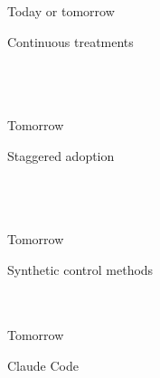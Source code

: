 \documentclass[aspectratio=169,11pt]{beamer}
\begin{document}
\begin{frame}{Today or tomorrow}
\vspace{1.4em}
\begin{center}
{\Large Continuous treatments}\\[1.8em]
{\large {}}\\[0.5em]
{\large {}}\\[0.5em]
{\large {}}\\[0.5em]
{\large {}}
\end{center}
\end{frame}

\begin{frame}{Tomorrow}
\vspace{1.4em}
\begin{center}
{\Large Staggered adoption}\\[1.8em]
{\large {}}\\[0.5em]
{\large {}}\\[0.5em]
{\large {}}\\[0.5em]
{\large {}}
\end{center}
\end{frame}

\begin{frame}{Tomorrow}
\vspace{1.4em}
\begin{center}
{\Large Synthetic control methods}\\[1.8em]
{\large {}}\\[0.5em]
{\large {}}\\[0.5em]
{\large {}}
\end{center}
\end{frame}


\begin{frame}{Tomorrow}
\vspace{1.4em}
\begin{center}
{\Large Claude Code}\\[1.8em]
{\large {}}
\end{center}
\end{frame}
\end{document}
